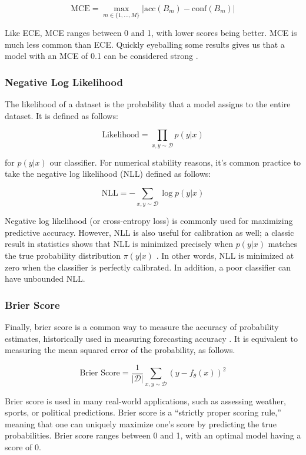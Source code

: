 \documentclass{article}
\newcommand{\acc}{\text{acc}}
\newcommand{\conf}{\text{conf}}
\newcommand{\D}{\mathcal{D}}
\begin{document}
\[
    \text{MCE} = \max_{m \in \{1, ..., M\}}|\acc(B_m) - \conf(B_m)|
\]

\noindent Like ECE, MCE ranges between 0 and 1, with lower scores being better. MCE is much less common than ECE. Quickly eyeballing some results gives us that a model with an MCE of 0.1 can be considered strong \cite{guo2017calibration}.

\subsubsection{Negative Log Likelihood}
The likelihood of a dataset is the probability that a model assigns to the entire dataset. It is defined as follows: 

\[
    \text{Likelihood} = \prod_{x, y \sim \D} p(y|x)
\]

\noindent for $p(y|x)$ our classifier. For numerical stability reasons, it's common practice to take the negative log likelihood (NLL) defined as follows:

\[
    \text{NLL} = -\sum_{x,y \sim \D} \log p(y|x)
\]

\noindent Negative log likelihood (or cross-entropy loss) is commonly used for maximizing predictive accuracy. However, NLL is also useful for calibration as well; a classic result in statistics shows that NLL is minimized precisely when $p(y|x)$ matches the true probability distribution $\pi(y|x)$ \cite{hastie2009elements}. In other words, NLL is minimized at zero when the classifier is perfectly calibrated. In addition, a poor classifier can have unbounded NLL.

\subsubsection{Brier Score}
Finally, brier score is a common way to measure the accuracy of probability estimates, historically used in measuring forecasting accuracy \cite{brier1950verification}. It is equivalent to measuring the mean squared error of the probability, as follows. 

\[
    \text{Brier Score} = \frac{1}{|\D|} \sum_{x,y \sim \D}(y - f_\theta(x))^2
\]

\noindent Brier score is used in many real-world applications, such as assessing weather, sports, or political predictions. Brier score is a “strictly proper scoring rule,” meaning that one can uniquely maximize one’s score by predicting the true probabilities. Brier score ranges between 0 and 1, with an optimal model having a score of 0.
\end{document}
